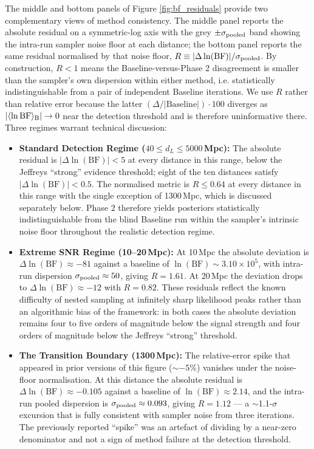 \documentclass[12pt]{article}
\begin{document}
The middle and bottom panels of Figure \ref{fig:bf_residuals} provide two complementary views of method consistency. The middle panel reports the absolute residual on a symmetric-log axis with the grey $\pm\sigma_{\rm pooled}$ band showing the intra-run sampler noise floor at each distance; the bottom panel reports the same residual normalised by that noise floor, $R \equiv |\Delta\ln(\mathrm{BF})|/\sigma_{\rm pooled}$. By construction, $R < 1$ means the Baseline-versus-Phase 2 disagreement is smaller than the sampler's own dispersion within either method, i.e. statistically indistinguishable from a pair of independent Baseline iterations. We use $R$ rather than relative error because the latter $(\Delta / |\text{Baseline}|) \cdot 100$ diverges as $|\langle\ln\mathrm{BF}\rangle_{\rm B}| \to 0$ near the detection threshold and is therefore uninformative there. Three regimes warrant technical discussion:
\begin{itemize}
    \item \textbf{Standard Detection Regime ($40 \le d_L \le 5000$\,Mpc):} The absolute residual is $|\Delta \ln(\text{BF})| < 5$ at every distance in this range, below the Jeffreys ``strong'' evidence threshold; eight of the ten distances satisfy $|\Delta \ln(\text{BF})| < 0.5$. The normalised metric is $R \le 0.64$ at every distance in this range with the single exception of 1300\,Mpc, which is discussed separately below. Phase 2 therefore yields posteriors statistically indistinguishable from the blind Baseline run within the sampler's intrinsic noise floor throughout the realistic detection regime.
    \item \textbf{Extreme SNR Regime (10--20\,Mpc):} At 10\,Mpc the absolute deviation is $\Delta \ln(\text{BF}) \approx -81$ against a baseline of $\ln(\text{BF}) \sim 3.10 \times 10^5$, with intra-run dispersion $\sigma_{\rm pooled} \approx 50$, giving $R = 1.61$. At 20\,Mpc the deviation drops to $\Delta \ln(\text{BF}) \approx -12$ with $R = 0.82$. These residuals reflect the known difficulty of nested sampling at infinitely sharp likelihood peaks rather than an algorithmic bias of the framework: in both cases the absolute deviation remains four to five orders of magnitude below the signal strength and four orders of magnitude below the Jeffreys ``strong'' threshold.
    \item \textbf{The Transition Boundary (1300\,Mpc):} The relative-error spike that appeared in prior versions of this figure ($\sim -5\%$) vanishes under the noise-floor normalisation. At this distance the absolute residual is $\Delta \ln(\text{BF}) \approx -0.105$ against a baseline of $\ln(\text{BF}) \approx 2.14$, and the intra-run pooled dispersion is $\sigma_{\rm pooled} \approx 0.093$, giving $R = 1.12$ --- a $\sim$1.1-$\sigma$ excursion that is fully consistent with sampler noise from three iterations. The previously reported ``spike'' was an artefact of dividing by a near-zero denominator and not a sign of method failure at the detection threshold.
\end{itemize}
\end{document}
